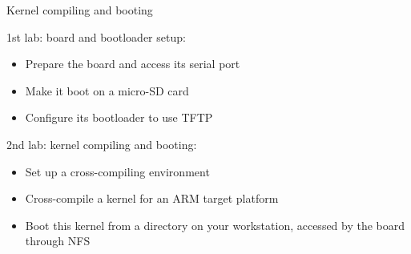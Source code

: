 \setuplabframe
{Kernel compiling and booting}
{
1st lab: board and bootloader setup:
  \begin{itemize}
  \item Prepare the board and access its serial port
  \item Make it boot on a micro-SD card
  \item Configure its bootloader to use TFTP
  \end{itemize}
2nd lab: kernel compiling and booting:
  \begin{itemize}
  \item Set up a cross-compiling environment
  \item Cross-compile a kernel for an ARM target platform
  \item Boot this kernel from a directory on your workstation,
    accessed by the board through NFS
  \end{itemize}
}
